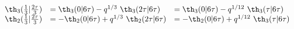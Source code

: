 \begin{equation}
    \begin{array}{lll}
      \th_3({1\over 3}|{2\tau\over 3}) &= \th_3(0|6\tau)
    -q^{1/3}~\th_3(2\tau|6\tau) &= \th_3(0|6\tau) -q^{1/12}~\th_3(\tau|6\tau)\\
      \th_2({1\over 3}|{2\tau\over 3}) &= -\th_2(0|6\tau)
   +q^{1/3}~\th_2(2\tau|6\tau) &= -\th_2(0|6\tau) +q^{1/12}~\th_3(\tau|6\tau)\\
    \end{array}
  \end{equation}

